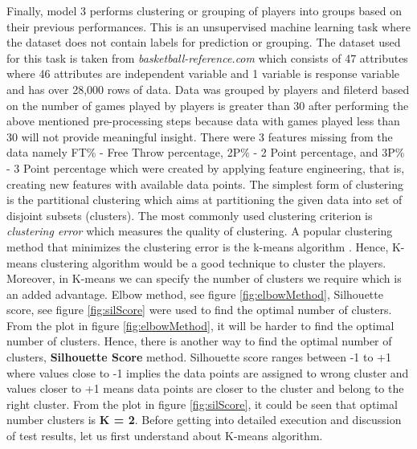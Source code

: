 \documentclass[format=sigconf]{acmart}
\begin{document}
Finally, model 3 performs clustering or grouping of players into groups based on their previous performances. This is an unsupervised
machine learning task where the dataset does not contain labels for prediction or grouping. The dataset used for this task is taken from 
\textit{basketball-reference.com} which consists of 47 attributes where 46 attributes are independent variable and 1 variable is 
response variable and has over 28,000 rows of data. Data was grouped by players and fileterd based on the number of games played by players 
is greater than 30 after performing the above mentioned pre-processing steps because data with games played less than 30 will not provide 
meaningful insight. There were 3 features missing from the data namely FT\% - Free Throw percentage, 2P\% - 2 Point percentage, and
3P\% - 3 Point percentage which were created by applying feature engineering, that is, creating new features with available data 
points. The simplest form of clustering is the partitional clustering which aims at partitioning the given data into set of disjoint
subsets (clusters). The most commonly used clustering criterion is \textit{clustering error} which measures the quality of clustering.
A popular clustering method that minimizes the clustering error is the k-means algorithm \cite{likas2003global}. Hence, K-means 
clustering algorithm would be a good technique to cluster the players. Moreover, in K-means we can specify the number of clusters 
we require which is an added advantage. Elbow method, see figure \ref{fig:elbowMethod}, Silhouette score, see figure \ref{fig:silScore} 
were used to find the optimal number of clusters. From the plot in figure \ref{fig:elbowMethod}, it will be harder to find the 
optimal number of clusters. Hence, there is another way to find the optimal number of clusters, \textbf{Silhouette Score} method.
Silhouette score ranges between -1 to +1 where values close to -1 implies the data points are assigned to wrong cluster and values 
closer to +1 means data points are closer to the cluster and belong to the right cluster. From the plot in figure \ref{fig:silScore}, 
it could be seen that optimal number clusters is \textbf{K = 2}.
Before getting into detailed execution and discussion of test results, let us 
first understand about K-means algorithm.
\end{document}
